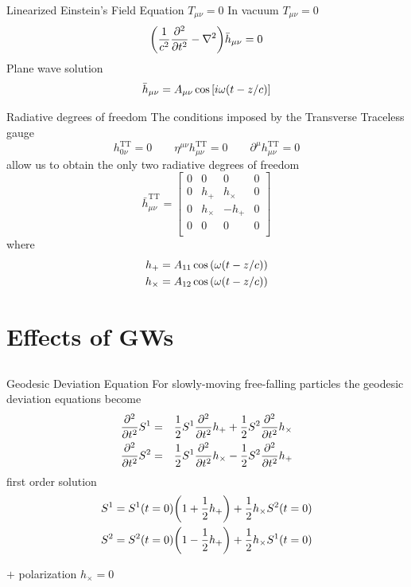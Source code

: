 \documentclass{beamer}
\newcommand{\bea}{\setlength{\jot}{10pt}\begin{eqnarray*}}
\newcommand{\eea}{\end{eqnarray*}}
\theoremstyle{definition}
\theoremstyle{plain}
\begin{document}
\begin{frame}{Linearized Einstein's Field Equation $T_{\mu \nu} =0$}
In vacuum $T_{\mu \nu}=0$
\[
\qty(
\dfrac{1}{c^{2}}
\pdv[2]{}{t}
-
\nabla ^{2}
)
\bar{h} _{\mu \nu} =0
\]
\vspace{1cm}
Plane wave solution 
\[
\bar{h}_{\mu \nu} = A_{\mu \nu} \cos\qty[i\omega ( t- z/c)]
\]
\end{frame}

\begin{frame}{Radiative degrees of freedom}
The conditions imposed by the Transverse Traceless gauge
\[
h^{\text{TT}}_{0 \nu} = 0 \qquad
\eta ^{\mu \nu } h^{\text{TT}}_{\mu \nu} =0
\qquad
\partial^{\mu} h^{\text{TT}} _{\mu \nu}=0
\]
allow us to obtain the only two radiative degrees of freedom
\[
\bar{h}^{\text{TT}}_{\mu \nu} =
\begin{bmatrix}
0 & 0 & 0 & 0 \\
0 & h_{+} & h_{\times} & 0 \\
0 & h_{\times} & -h_{+} & 0 \\
0 & 0 & 0 & 0 \\
\end{bmatrix}
\]
where 
\bea
h_{+} = A _{11} \cos \qty(\omega(t-z/c)) \\
h_{\times} =  A _{12} \cos \qty(\omega(t-z/c))
\eea
\end{frame}


\section{Effects of GWs}
\subsection{}
\begin{frame}{Geodesic Deviation Equation}
For slowly-moving free-falling particles the geodesic deviation equations become
\bea
\pdv[2]{}{t} S^{1} &=& \dfrac{1}{2} S^{1} \pdv[2]{}{t} h_{+} + \dfrac{1}{2} S^{2} \pdv[2]{}{t} h_{\times} \\
\pdv[2]{}{t} S^{2} &=& \dfrac{1}{2} S^{1} \pdv[2]{}{t} h_{\times} - \dfrac{1}{2} S^{2} \pdv[2]{}{t} h_{+}
\eea
first order solution
\bea
S^{1} = S^{1}(t=0) \qty(1 + \dfrac{1}{2} h_{+})+ \dfrac{1}{2} h_{\times} S^{2}(t=0) \\
S^{2} = S^{2}(t=0) \qty(1 - \dfrac{1}{2} h_{+}) +  \dfrac{1}{2} h_{\times} S^{1}(t=0)
\eea
\end{frame}




\begin{frame}{$+$ polarization $h_{\times}=0$}
	\begin{figure}
    \centering
    \end{figure}
\end{frame}
\end{document}
